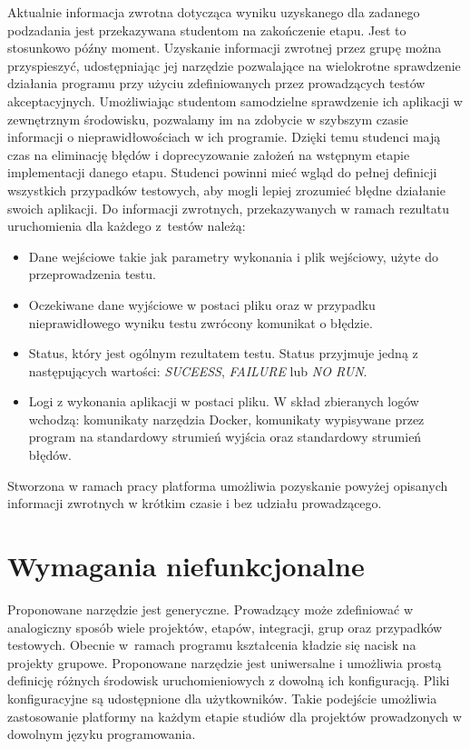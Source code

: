 Aktualnie informacja zwrotna dotycząca wyniku uzyskanego dla zadanego podzadania jest przekazywana studentom na zakończenie etapu.
Jest to stosunkowo późny moment.
Uzyskanie informacji zwrotnej przez grupę można przyspieszyć, udostępniając jej narzędzie pozwalające na wielokrotne sprawdzenie działania programu przy użyciu zdefiniowanych przez prowadzących testów akceptacyjnych.
Umożliwiając studentom samodzielne sprawdzenie ich aplikacji w zewnętrznym środowisku, pozwalamy im na zdobycie w szybszym czasie informacji o nieprawidłowościach w ich programie.
Dzięki temu studenci mają czas na eliminację błędów i doprecyzowanie założeń na wstępnym etapie implementacji danego etapu.
Studenci powinni mieć wgląd do pełnej definicji wszystkich przypadków testowych, aby mogli lepiej zrozumieć błędne działanie swoich aplikacji.
Do informacji zwrotnych, przekazywanych w ramach rezultatu uruchomienia dla każdego z~testów należą:
\begin{itemize}
    \item Dane wejściowe takie jak parametry wykonania i plik wejściowy, użyte do przeprowadzenia testu.
    \item Oczekiwane dane wyjściowe w postaci pliku oraz w przypadku nieprawidłowego wyniku testu zwrócony komunikat o błędzie.
    \item Status, który jest ogólnym rezultatem testu.
    Status przyjmuje jedną z następujących wartości: \textit{SUCEESS}, \textit{FAILURE} lub \textit{NO RUN}.
    \item Logi z wykonania aplikacji w postaci pliku.
    W skład zbieranych logów wchodzą: komunikaty narzędzia Docker, komunikaty wypisywane przez program na standardowy strumień wyjścia oraz standardowy strumień błędów.
\end{itemize}

Stworzona w ramach pracy platforma umożliwia pozyskanie powyżej opisanych informacji zwrotnych w krótkim czasie i bez udziału prowadzącego.


\section{Wymagania niefunkcjonalne}

Proponowane narzędzie jest generyczne.
Prowadzący może zdefiniować w analogiczny sposób wiele projektów, etapów, integracji, grup oraz przypadków testowych.
Obecnie w~ramach programu kształcenia kładzie się nacisk na projekty grupowe.
Proponowane narzędzie jest uniwersalne i umożliwia prostą definicję różnych środowisk uruchomieniowych z dowolną ich konfiguracją.
Pliki konfiguracyjne są udostępnione dla użytkowników.
Takie podejście umożliwia zastosowanie platformy na każdym etapie studiów dla projektów prowadzonych w dowolnym języku programowania.

